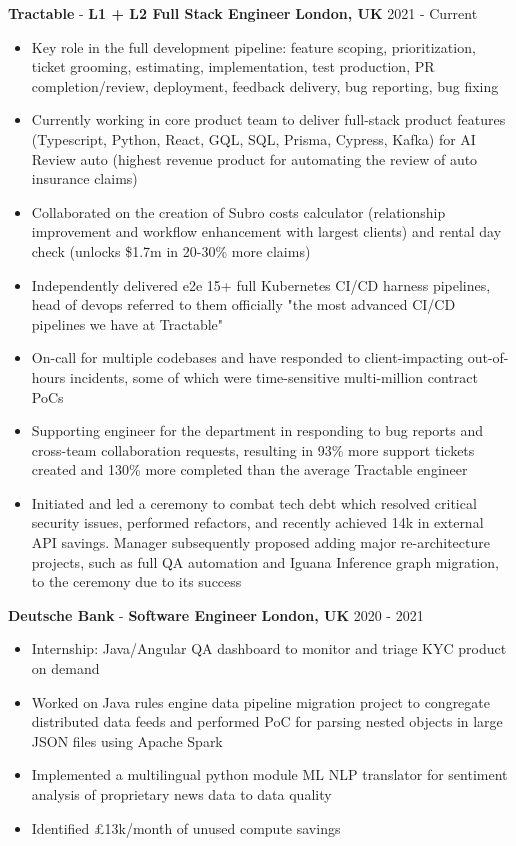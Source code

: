 \documentclass[a4paper]{article}
\begin{document}
\textbf{Tractable} - \textbf{L1 + L2 Full Stack Engineer} \hfill \textbf{London, UK}  2021 - Current \\
\vspace{-2mm}
\begin{itemize} \itemsep 0pt
    \item Key role in the full development pipeline: feature scoping, prioritization, ticket grooming, estimating, implementation, test production, PR completion/review, deployment, feedback delivery, bug reporting, bug fixing
    \item Currently working in core product team to deliver full-stack product features (Typescript, Python, React, GQL, SQL, Prisma, Cypress, Kafka) for AI Review auto (highest revenue product for automating the review of auto insurance claims)
    \item Collaborated on the creation of Subro costs calculator (relationship improvement and workflow enhancement with largest clients) and rental day check (unlocks \$1.7m in 20-30\% more claims)
    \item Independently delivered e2e 15+ full Kubernetes CI/CD harness pipelines, head of devops referred to them officially "the most advanced CI/CD pipelines we have at Tractable"
    \item On-call for multiple codebases and have responded to client-impacting out-of-hours incidents, some of which were time-sensitive multi-million contract PoCs
    \item Supporting engineer for the department in responding to bug reports and cross-team collaboration requests, resulting in 93\% more support tickets created and 130\% more completed than the average Tractable engineer
    \item Initiated and led a ceremony to combat tech debt which resolved critical security issues, performed refactors, and recently achieved 14k in external API savings. Manager subsequently proposed adding major re-architecture projects, such as full QA automation and Iguana Inference graph migration, to the ceremony due to its success
\end{itemize}
\vspace{-1mm}

\textbf{Deutsche Bank} - \textbf{Software Engineer} \hfill \textbf{London, UK}  2020 - 2021 \\
\vspace{-2mm}
\begin{itemize} \itemsep 0pt
    \item Internship: Java/Angular QA dashboard to monitor and triage KYC product on demand
    \item Worked on Java rules engine data pipeline migration project to congregate distributed data feeds and performed PoC for parsing nested objects in large JSON files using Apache Spark
    \item Implemented a multilingual python module ML NLP translator for sentiment analysis of proprietary news data to data quality
    \item Identified \pounds13k/month of unused compute savings
\end{itemize}
\vspace{-1mm}
\end{document}
